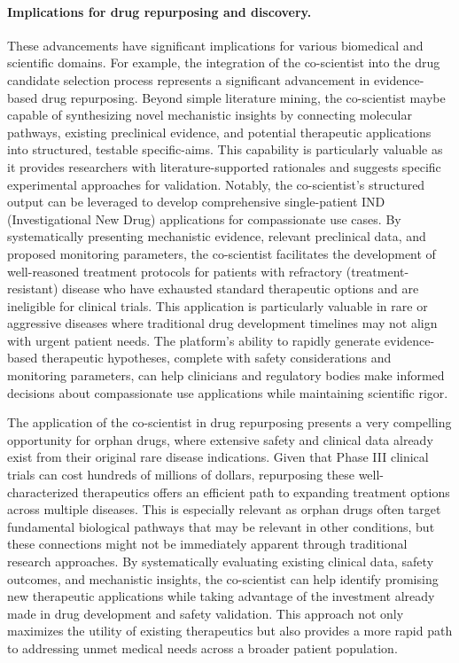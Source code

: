 \paragraph{Implications for drug repurposing and discovery.}
These advancements have significant implications for various biomedical and scientific domains. For example, the integration of the co-scientist into the drug candidate selection process represents a significant advancement in evidence-based drug repurposing. Beyond simple literature mining, the co-scientist maybe capable of synthesizing novel mechanistic insights by connecting molecular pathways, existing preclinical evidence, and potential therapeutic applications into structured, testable specific-aims. This capability is particularly valuable as it provides researchers with literature-supported rationales and suggests specific experimental approaches for validation. Notably, the co-scientist's structured output can be leveraged to develop comprehensive single-patient IND (Investigational New Drug) applications for compassionate use cases. By systematically presenting mechanistic evidence, relevant preclinical data, and proposed monitoring parameters, the co-scientist facilitates the development of well-reasoned treatment protocols for patients with refractory (treatment-resistant) disease who have exhausted standard therapeutic options and are ineligible for clinical trials. This application is particularly valuable in rare or aggressive diseases where traditional drug development timelines may not align with urgent patient needs. The platform's ability to rapidly generate evidence-based therapeutic hypotheses, complete with safety considerations and monitoring parameters, can help clinicians and regulatory bodies make informed decisions about compassionate use applications while maintaining scientific rigor.

The application of the co-scientist in drug repurposing presents a very compelling opportunity for orphan drugs, where extensive safety and clinical data already exist from their original rare disease indications. Given that Phase III clinical trials can cost hundreds of millions of dollars, repurposing these well-characterized therapeutics offers an efficient path to expanding treatment options across multiple diseases. This is especially relevant as orphan drugs often target fundamental biological pathways that may be relevant in other conditions, but these connections might not be immediately apparent through traditional research approaches. By systematically evaluating existing clinical data, safety outcomes, and mechanistic insights, the co-scientist can help identify promising new therapeutic applications while taking advantage of the investment already made in drug development and safety validation. This approach not only maximizes the utility of existing therapeutics but also provides a more rapid path to addressing unmet medical needs across a broader patient population.


